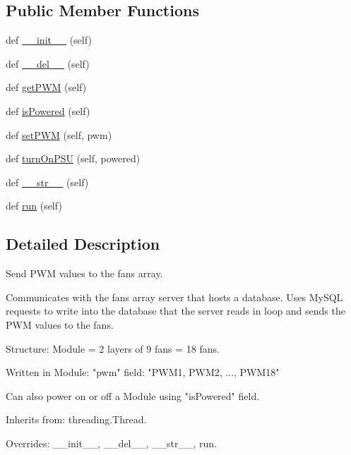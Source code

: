 \subsection*{Public Member Functions}
\begin{DoxyCompactItemize}
\item 
def \mbox{\hyperlink{classwindshape_1_1fansarray_1_1_fans_array_1_1_fans_array_a687c03adb1154426ef089168dcbadc34}{\+\_\+\+\_\+init\+\_\+\+\_\+}} (self)
\item 
def \mbox{\hyperlink{classwindshape_1_1fansarray_1_1_fans_array_1_1_fans_array_adde804756bae93dadb093223f56b05fa}{\+\_\+\+\_\+del\+\_\+\+\_\+}} (self)
\item 
def \mbox{\hyperlink{classwindshape_1_1fansarray_1_1_fans_array_1_1_fans_array_a56e88cf7d3e1c3804ad8f22bae65ac45}{get\+P\+WM}} (self)
\item 
def \mbox{\hyperlink{classwindshape_1_1fansarray_1_1_fans_array_1_1_fans_array_ae9e1608f5d5faf5602a036983dec76ea}{is\+Powered}} (self)
\item 
def \mbox{\hyperlink{classwindshape_1_1fansarray_1_1_fans_array_1_1_fans_array_a420bbec4827c3a8fb3bff65aaba918d7}{set\+P\+WM}} (self, pwm)
\item 
def \mbox{\hyperlink{classwindshape_1_1fansarray_1_1_fans_array_1_1_fans_array_adafadce72737f9e1228fa6ff0cd93779}{turn\+On\+P\+SU}} (self, powered)
\item 
def \mbox{\hyperlink{classwindshape_1_1fansarray_1_1_fans_array_1_1_fans_array_aceaf476d88639804e38c4af301acfec1}{\+\_\+\+\_\+str\+\_\+\+\_\+}} (self)
\item 
def \mbox{\hyperlink{classwindshape_1_1fansarray_1_1_fans_array_1_1_fans_array_afa94dcdf36ecce45c8189bb68fe8efe9}{run}} (self)
\end{DoxyCompactItemize}


\subsection{Detailed Description}
\begin{DoxyVerb}Send PWM values to the fans array.

Communicates with the fans array server that hosts a database. Uses
MySQL requests to write into the database that the server reads in
loop and sends the PWM values to the fans.

Structure: Module = 2 layers of 9 fans = 18 fans.

Written in Module: "pwm" field: "PWM1, PWM2, ..., PWM18"

Can also power on or off a Module using "isPowered" field.

Inherits from: threading.Thread.

Overrides: __init__, __del__, __str__, run.
\end{DoxyVerb}
 

